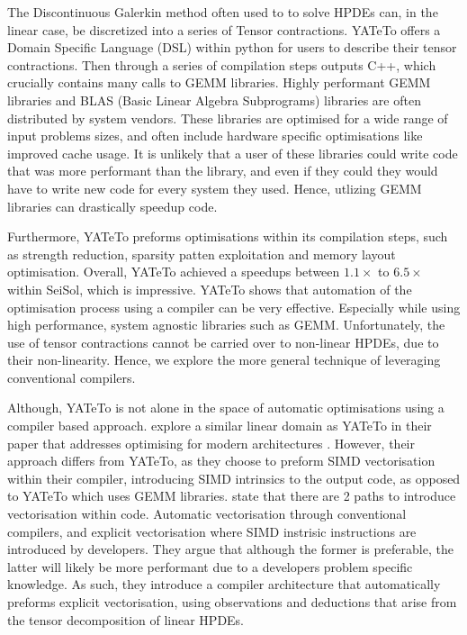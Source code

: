 The Discontinuous Galerkin method often used to to solve HPDEs can, in the linear case, be discretized into a series of Tensor contractions.
YATeTo offers a Domain Specific Language (DSL) within python for users to describe their tensor contractions.
Then through a series of compilation steps outputs C++, which crucially contains many calls to GEMM libraries.
Highly performant GEMM libraries and BLAS (Basic Linear Algebra Subprograms) libraries are often distributed by system vendors.
These libraries are optimised for a wide range of input problems sizes, and often include hardware specific optimisations like improved cache usage.
It is unlikely that a user of these libraries could write code that was more performant than the library, and even if they could they would have to write new code for every system they used.
Hence, utlizing GEMM libraries can drastically speedup code.

Furthermore, YATeTo preforms optimisations within its compilation steps, such as strength reduction, sparsity patten exploitation and memory layout optimisation.
Overall, YATeTo achieved a speedups between $1.1\times$ to $6.5 \times$ within SeiSol, which is impressive.
YATeTo shows that automation of the optimisation process using a compiler can be very effective.
Especially while using high performance, system agnostic libraries such as GEMM.
Unfortunately, the use of tensor contractions cannot be carried over to non-linear HPDEs, due to their non-linearity.
Hence, we explore the more general technique of leveraging conventional compilers.   





Although, YATeTo is not alone in the space of automatic optimisations using a compiler based approach.
\citeauthor{codegen_dg_SIMD} explore a similar linear domain as YATeTo in their paper that addresses optimising for modern architectures \cite{codegen_dg_SIMD}. 
However, their approach differs from YATeTo, as they choose to preform SIMD vectorisation within their compiler, introducing SIMD intrinsics to the output code, as opposed to YATeTo which uses GEMM libraries.
\citeauthor{codegen_dg_SIMD} state that there are 2 paths to introduce vectorisation within code.
Automatic vectorisation through conventional compilers, and explicit vectorisation where SIMD instrisic instructions are introduced by developers.
They argue that although the former is preferable, the latter will likely be more performant due to a developers problem specific knowledge.
As such, they introduce a compiler architecture that automatically preforms explicit vectorisation, using observations and deductions that arise from the tensor decomposition of linear HPDEs.

